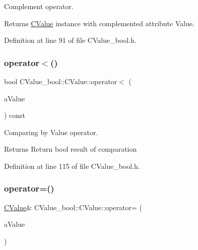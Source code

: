 Complement operator. 

\begin{DoxyReturn}{Returns}
\hyperlink{class_c_value__bool_1_1_c_value}{C\+Value} instance with complemented attribute Value. 
\end{DoxyReturn}


Definition at line 91 of file C\+Value\+\_\+bool.\+h.

\mbox{\label{class_c_value__bool_1_1_c_value_ac23e4f8e65e397ae113818bf679f438f}} 
\subsubsection{\texorpdfstring{operator$<$()}{operator<()}}
{\footnotesize\ttfamily bool C\+Value\+\_\+bool\+::\+C\+Value\+::operator$<$ (\begin{DoxyParamCaption}\item[{const \hyperlink{class_c_value__bool_1_1_c_value}{C\+Value} \&}]{a\+Value }\end{DoxyParamCaption}) const\hspace{0.3cm}{\ttfamily [inline]}}



Comparing by Value operator. 

\begin{DoxyReturn}{Returns}
Return {\ttfamily bool} result of comparation 
\end{DoxyReturn}


Definition at line 115 of file C\+Value\+\_\+bool.\+h.

\mbox{\label{class_c_value__bool_1_1_c_value_ace6035c9ce867111440ef2c9c336852f}} 
\subsubsection{\texorpdfstring{operator=()}{operator=()}}
{\footnotesize\ttfamily \hyperlink{class_c_value__bool_1_1_c_value}{C\+Value}\& C\+Value\+\_\+bool\+::\+C\+Value\+::operator= (\begin{DoxyParamCaption}\item[{const \hyperlink{class_c_value__bool_1_1_c_value}{C\+Value} \&}]{a\+Value }\end{DoxyParamCaption})\hspace{0.3cm}{\ttfamily [inline]}}



